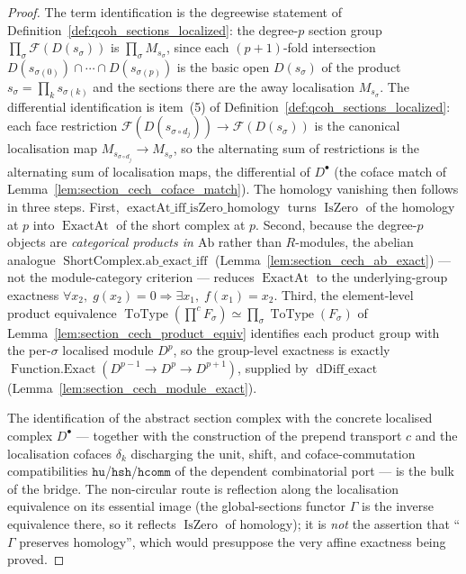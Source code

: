 \begin{proof}
  The term identification is the degreewise statement of
  Definition~\ref{def:qcoh_sections_localized}: the degree-\(p\) section group
  \(\prod_\sigma \mathcal{F}(D(s_\sigma))\) is \(\prod_\sigma M_{s_\sigma}\), since
  each \((p+1)\)-fold intersection \(D(s_{\sigma(0)}) \cap \cdots \cap
  D(s_{\sigma(p)})\) is the basic open \(D(s_\sigma)\) of the product
  \(s_\sigma = \prod_k s_{\sigma(k)}\) and the sections there are the away
  localisation \(M_{s_\sigma}\). The differential identification is item~(5) of
  Definition~\ref{def:qcoh_sections_localized}: each face restriction
  \(\mathcal{F}(D(s_{\sigma \circ d_j})) \to \mathcal{F}(D(s_\sigma))\) is the
  canonical localisation map \(M_{s_{\sigma \circ d_j}} \to M_{s_\sigma}\), so the
  alternating sum of restrictions is the alternating sum of localisation maps, the
  differential of \(D^\bullet\) (the coface match of
  Lemma~\ref{lem:section_cech_coface_match}). The homology vanishing then follows in
  three steps. First, \(\operatorname{exactAt\_iff\_isZero\_homology}\) turns
  \(\operatorname{IsZero}\) of the homology at \(p\) into \(\operatorname{ExactAt}\) of
  the short complex at \(p\). Second, because the degree-\(p\) objects are
  \emph{categorical products in \(\mathrm{Ab}\)} rather than \(R\)-modules, the abelian
  analogue \(\operatorname{ShortComplex.ab\_exact\_iff}\)
  (Lemma~\ref{lem:section_cech_ab_exact}) --- not the module-category criterion ---
  reduces \(\operatorname{ExactAt}\) to the underlying-group exactness
  \(\forall x_2,\; g(x_2) = 0 \Rightarrow \exists x_1,\; f(x_1) = x_2\). Third, the
  element-level product equivalence
  \(\operatorname{ToType}(\prod^{c} F_\sigma) \simeq \prod_\sigma
  \operatorname{ToType}(F_\sigma)\) of Lemma~\ref{lem:section_cech_product_equiv}
  identifies each product group with the per-\(\sigma\) localised module \(D^p\), so the
  group-level exactness is exactly \(\operatorname{Function.Exact}(D^{p-1} \to D^p \to
  D^{p+1})\), supplied by \(\operatorname{dDiff\_exact}\)
  (Lemma~\ref{lem:section_cech_module_exact}).

  The identification of the abstract section complex with the concrete localised
  complex \(D^\bullet\) --- together with the construction of the prepend transport
  \(c\) and the localisation cofaces \(\delta_k\) discharging the unit, shift, and
  coface-commutation compatibilities \(\mathtt{hu}\)/\(\mathtt{hsh}\)/\(\mathtt{hcomm}\)
  of the dependent combinatorial port --- is the bulk of the bridge. The non-circular
  route is reflection along the localisation equivalence on its essential image (the
  global-sections functor \(\Gamma\) is the inverse equivalence there, so it reflects
  \(\operatorname{IsZero}\) of homology); it is \emph{not} the assertion that
  ``\(\Gamma\) preserves homology'', which would presuppose the very affine exactness
  being proved.
\end{proof}

